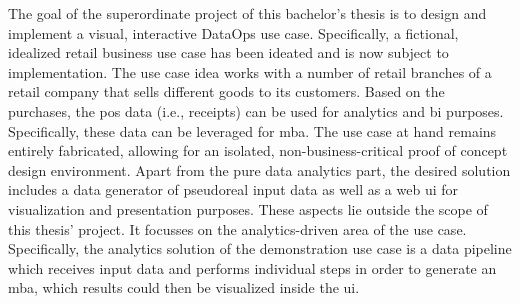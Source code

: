The goal of the superordinate project of this bachelor's thesis is to design and implement a visual, interactive DataOps use case. Specifically, a fictional, idealized retail business use case has been ideated and is now subject to implementation. The use case idea works with a number of retail branches of a retail company that sells different goods to its customers. Based on the purchases, the \ac{pos} data (i.e., receipts) can be used for analytics and \ac{bi} purposes. Specifically, these data can be leveraged for \ac{mba}. The use case at hand remains entirely fabricated, allowing for an isolated, non-business-critical proof of concept design environment. Apart from the pure data analytics part, the desired solution includes a data generator of pseudoreal input data as well as a web \acs{ui} for visualization and presentation purposes. These aspects lie outside the scope of this thesis' project. It focusses on the analytics-driven area of the use case. Specifically, the analytics solution of the demonstration use case is a data pipeline which receives input data and performs individual steps in order to generate an \ac{mba}, which results could then be visualized inside the \ac{ui}.